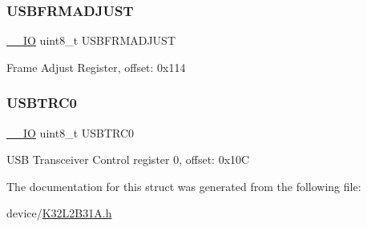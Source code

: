 \subsubsection{\texorpdfstring{USBFRMADJUST}{USBFRMADJUST}}
{\footnotesize\ttfamily \mbox{\hyperlink{core__cm0plus_8h_aec43007d9998a0a0e01faede4133d6be}{\+\_\+\+\_\+\+IO}} uint8\+\_\+t U\+S\+B\+F\+R\+M\+A\+D\+J\+U\+ST}

Frame Adjust Register, offset\+: 0x114 \mbox{\label{struct_u_s_b___type_ac89afa76ff77065c1cf493a11c82b831}} 
\subsubsection{\texorpdfstring{USBTRC0}{USBTRC0}}
{\footnotesize\ttfamily \mbox{\hyperlink{core__cm0plus_8h_aec43007d9998a0a0e01faede4133d6be}{\+\_\+\+\_\+\+IO}} uint8\+\_\+t U\+S\+B\+T\+R\+C0}

U\+SB Transceiver Control register 0, offset\+: 0x10C 

The documentation for this struct was generated from the following file\+:\begin{DoxyCompactItemize}
\item 
device/\mbox{\hyperlink{_k32_l2_b31_a_8h}{K32\+L2\+B31\+A.\+h}}\end{DoxyCompactItemize}
